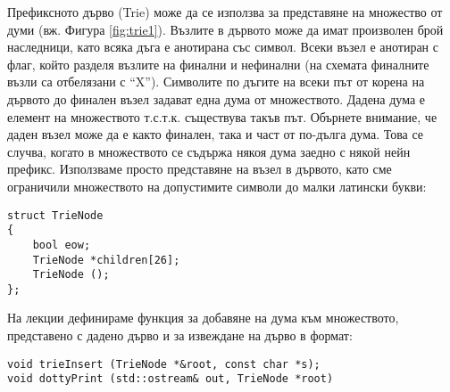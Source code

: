 \begin{mdframed}[hidealllines=true,backgroundcolor=gray!20]
Префиксното дърво (Trie) може да се използва за представяне на множество от думи (вж. Фигура \ref{fig:trie1}). Възлите в дървото може да имат произволен брой наследници, като всяка дъга е анотирана със символ. Всеки възел е анотиран с флаг, който разделя възлите на финални и нефинални (на схемата финалните възли са отбелязани с ``X''). Символите по дъгите на всеки път от корена на дървото до финален възел задават една дума от множеството. Дадена дума е елемент на множеството т.с.т.к. съществува такъв път. Обърнете внимание, че даден възел може да е както финален, така и част от по-дълга дума. Това се случва, когато в множеството се съдържа някоя дума заедно с някой нейн префикс.
Използваме просто представяне на възел в дървото, като сме ограничили множеството на допустимите символи до малки латински букви:

\begin{verbatim}
struct TrieNode
{
    bool eow;
    TrieNode *children[26];
    TrieNode ();
};
\end{verbatim}
На лекции дефинираме функция за добавяне на дума към множеството, представено с дадено дърво и за извеждане на дърво в  формат:
\begin{verbatim}
void trieInsert (TrieNode *&root, const char *s);
void dottyPrint (std::ostream& out, TrieNode *root)

\end{verbatim}
\end{mdframed}

